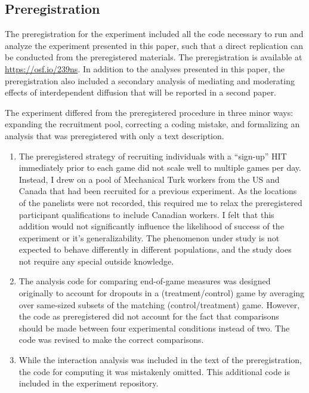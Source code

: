 \documentclass{article}
\begin{document}
\subsection{Preregistration}
\label{prereg}

The preregistration for the experiment included all the code necessary to run and analyze the experiment presented in this paper, such that a direct replication can be conducted from the preregistered materials. The preregistration is available at \href{https://osf.io/239ns}{https://osf.io/239ns}. In addition to the analyses presented in this paper, the preregistration also included a secondary analysis of mediating and moderating effects of interdependent diffusion that will be reported in a second paper. 

The experiment differed from the preregistered procedure in three minor ways: expanding the recruitment pool, correcting a coding mistake, and formalizing an analysis that was preregistered with only a text description.

\begin{enumerate}
    \item The preregistered strategy of recruiting individuals with a “sign-up” HIT immediately prior to each game did not scale well to multiple games per day. Instead, I drew on a pool of Mechanical Turk workers from the US and Canada that had been recruited for a previous experiment. As the locations of the panelists were not recorded, this required me to relax the preregistered participant qualifications to include Canadian workers. I felt that this addition would not significantly influence the likelihood of success of the experiment or it’s generalizability. The phenomenon under study is not expected to behave differently in different populations, and the study does not require any special outside knowledge.
    
    \item The analysis code for comparing end-of-game measures was designed originally to account for dropouts in a (treatment/control) game by averaging over same-sized subsets of the matching (control/treatment) game. However, the code as preregistered did not account for the fact that comparisons should be made between four experimental conditions instead of two. The code was revised to make the correct comparisons.
    
    \item While the interaction analysis was included in the text of the preregistration, the code for computing it was mistakenly omitted. This additional code is included in the experiment repository.

\end{enumerate}
\end{document}
